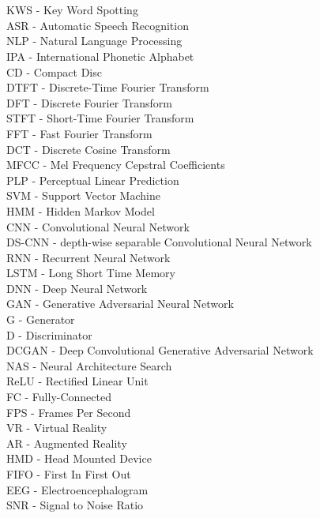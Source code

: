 
\chapter*{}
KWS - Key Word Spotting\\
ASR - Automatic Speech Recognition\\
NLP - Natural Language Processing\\
IPA - International Phonetic Alphabet\\
CD - Compact Disc\\
%
DTFT - Discrete-Time Fourier Transform\\
DFT - Discrete Fourier Transform\\
STFT - Short-Time Fourier Transform\\
FFT - Fast Fourier Transform\\
DCT - Discrete Cosine Transform\\
MFCC - Mel Frequency Cepstral Coefficients\\
PLP - Perceptual Linear Prediction\\
%
SVM - Support Vector Machine\\
HMM - Hidden Markov Model\\
%
CNN - Convolutional Neural Network\\
DS-CNN - depth-wise separable Convolutional Neural Network\\
RNN - Recurrent Neural Network\\
LSTM - Long Short Time Memory\\
DNN - Deep Neural Network\\
GAN - Generative Adversarial Neural Network\\
G - Generator\\
D - Discriminator\\
DCGAN - Deep Convolutional Generative Adversarial Network\\
NAS - Neural Architecture Search\\
ReLU - Rectified Linear Unit\\
FC - Fully-Connected\\
%
FPS - Frames Per Second\\
VR - Virtual Reality\\
AR - Augmented Reality\\
HMD - Head Mounted Device\\
%
FIFO - First In First Out\\
%
EEG - Electroencephalogram\\
SNR - Signal to Noise Ratio\\